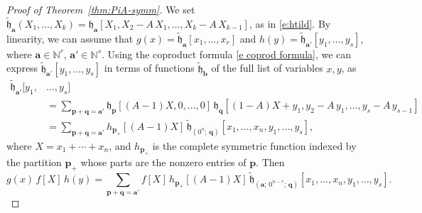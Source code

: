 \documentclass[10pt,a4paper]{amsart}
\newcommand{\NN}{{\mathbb N}}
\newcommand{\aA}{{\mathbf a}}
\newcommand{\bb}{{\mathbf b}}
\newcommand{\fh}{{\mathfrak h}}
\newcommand{\pp}{{\mathbf p}}
\newcommand{\qq}{{\mathbf q}}
\newcommand{\tfh}{{\widetilde{\mathfrak h}}}
\begin{document}
\begin{proof}[Proof of Theorem~\ref{thm:PiA-symm}] We set $\tfh _{\aA
}(X_{1},\ldots,X_{k}) = \fh_{\aA }[X_{1}, X_{2} - A\, X_{1}, \ldots,
X_{k} - A\, X_{k-1}]$, as in \eqref{e:htild}.  By linearity, we can
assume that $g(x) = \tfh _{\aA }[x_{1}, \ldots, x_{r}]$ and $h(y) =
\tfh _{\aA '}[y_{1}, \ldots, y_{s}]$, where $\aA \in \NN ^{r}$, $\aA
'\in \NN ^{s}$.  Using the coproduct formula \eqref{e coprod formula},
we can express $\tfh _{\aA '}[y_{1}, \ldots, y_{s}] $ in terms of
functions $\tfh _{\bb }$ of the full list of variables $x, y$, as
\begin{equation}\label{e:hy-A-extended}
\begin{aligned}
\tfh _{\aA '}[y_{1},& \ldots, y_{s}] \\
& = \sum _{\pp +\qq =\aA '} \fh_{\pp }[(A-1)X,0,\ldots,0]\, \fh_{\qq
}[(1-A)X + y_{1}, y_{2} - A\, y_{1}, \ldots, y_{s} - A\, y_{s-1}]\\
& = \sum _{\pp +\qq =\aA '} h_{\pp _{+}}[(A-1)X]\, \tfh
_{(0^{n};\, \qq) }[x_{1}, \ldots, x_{n}, y_{1}, \ldots, y_{s}],
\end{aligned}
\end{equation}
where $X = x_{1}+\cdots +x_{n}$, and $h_{\pp _{+}}$ is the complete
symmetric function indexed by the partition $\pp _{+}$ whose parts are
the nonzero entries of $\pp $.  Then
\begin{equation}\label{e:fgh-by-ha}
g(x)\, f[X]\, h(y) = \sum _{\pp +\qq =\aA '} f[X]\,
h_{\pp _{+}}[(A-1)X]\, \tfh_{(\aA ;\, 0^{n-r};\, \qq) }[x_{1},
\ldots, x_{n}, y_{1}, \ldots, y_{s}].
\end{equation}


\end{proof}
\end{document}
